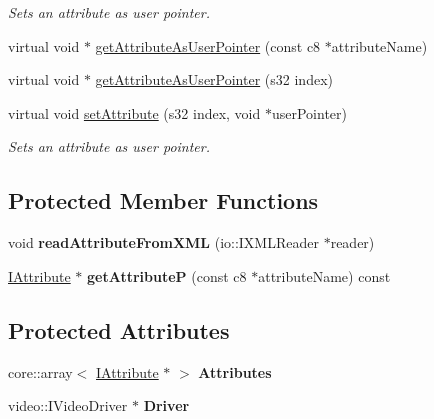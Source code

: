 \begin{DoxyCompactItemize}
\begin{DoxyCompactList}\small\item\em Sets an attribute as user pointer. \end{DoxyCompactList}\item 
virtual void $\ast$ \hyperlink{classirr_1_1io_1_1_c_attributes_acb0280891d4f31c676f2c3bbf4d14728}{get\-Attribute\-As\-User\-Pointer} (const c8 $\ast$attribute\-Name)
\item 
virtual void $\ast$ \hyperlink{classirr_1_1io_1_1_c_attributes_a89ba39cf2b1a3d04c0dbbd0615609378}{get\-Attribute\-As\-User\-Pointer} (s32 index)
\item 
\hypertarget{classirr_1_1io_1_1_c_attributes_a8d334ea86a307ba33e41d37431a1d500}{virtual void \hyperlink{classirr_1_1io_1_1_c_attributes_a8d334ea86a307ba33e41d37431a1d500}{set\-Attribute} (s32 index, void $\ast$user\-Pointer)}\label{classirr_1_1io_1_1_c_attributes_a8d334ea86a307ba33e41d37431a1d500}

\begin{DoxyCompactList}\small\item\em Sets an attribute as user pointer. \end{DoxyCompactList}\end{DoxyCompactItemize}
\subsection*{Protected Member Functions}
\begin{DoxyCompactItemize}
\item 
\hypertarget{classirr_1_1io_1_1_c_attributes_a15d4adb07fda946a23668e91f9b8dc06}{void {\bfseries read\-Attribute\-From\-X\-M\-L} (io\-::\-I\-X\-M\-L\-Reader $\ast$reader)}\label{classirr_1_1io_1_1_c_attributes_a15d4adb07fda946a23668e91f9b8dc06}

\item 
\hypertarget{classirr_1_1io_1_1_c_attributes_ac79bdfac127796ef6c7f1350181c891d}{\hyperlink{classirr_1_1io_1_1_i_attribute}{I\-Attribute} $\ast$ {\bfseries get\-Attribute\-P} (const c8 $\ast$attribute\-Name) const }\label{classirr_1_1io_1_1_c_attributes_ac79bdfac127796ef6c7f1350181c891d}

\end{DoxyCompactItemize}
\subsection*{Protected Attributes}
\begin{DoxyCompactItemize}
\item 
\hypertarget{classirr_1_1io_1_1_c_attributes_a0b094d948038fb623b93ed30d9bdf6d0}{core\-::array$<$ \hyperlink{classirr_1_1io_1_1_i_attribute}{I\-Attribute} $\ast$ $>$ {\bfseries Attributes}}\label{classirr_1_1io_1_1_c_attributes_a0b094d948038fb623b93ed30d9bdf6d0}

\item 
\hypertarget{classirr_1_1io_1_1_c_attributes_ad2572d1711c06bbd7c428a7e7db25444}{video\-::\-I\-Video\-Driver $\ast$ {\bfseries Driver}}\label{classirr_1_1io_1_1_c_attributes_ad2572d1711c06bbd7c428a7e7db25444}

\end{DoxyCompactItemize}


